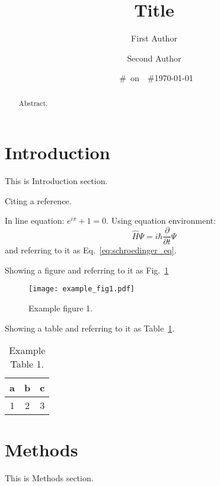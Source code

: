 \documentclass[aps,prl,twocolumn,superscriptaddress,showpacs]{revtex4-2}
\begin{document}
\ifdefined\GITHASH
    \ifdefined\GITDATE
        \ifdefined\GITBRANCH
            \date{\GITDATE\ \#\GITHASH\ on\ \GITBRANCH}
        \else
            \date{\GITDATE\ \#\GITHASH}
        \fi
    \fi
\else
    \date{\today}
\fi

\title{Title}
\author{First Author}
\author{Second Author}

\begin{abstract}
Abstract.
\end{abstract}

\flushbottom
\maketitle

\thispagestyle{empty}

\section*{Introduction}
This is Introduction section.

Citing a reference\cite{example}.

In line equation: $e^{i\pi} + 1 = 0$.
Using equation environment:
\begin{equation}
    \hat{H}\Psi = i\hbar\frac{\partial}{\partial t}\Psi
    \label{eq:schroedinger_eq}
\end{equation}
and referring to it as Eq.~\ref{eq:schroedinger_eq}.

Showing a figure and referring to it as Fig.~\ref{fig:example_fig1}
\begin{figure}
    \caption{
    Example figure 1.
    }
    \label{fig:example_fig1}
    \texttt{[image: example\_fig1.pdf]}
\end{figure}


Showing a table and referring to it as Table~\ref{table:example_table1}.
\begin{table}
    \caption{
        Example Table 1.
    }
    \label{table:example_table1}
    \centering
    \begin{tabular}{ccc}
       a & b & c \\
       \hline
       1 & 2 & 3 \\
    \end{tabular}
\end{table}

\section*{Methods}
This is Methods section.
\end{document}
